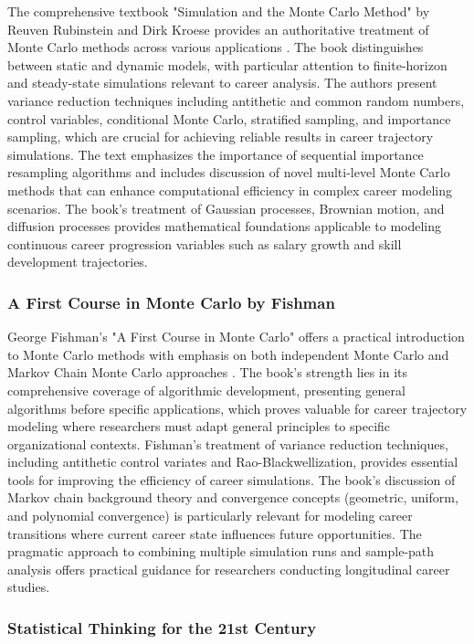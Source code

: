 \documentclass[main.tex]{subfiles}
\begin{document}
The comprehensive textbook "Simulation and the Monte Carlo Method" by Reuven Rubinstein and Dirk Kroese provides an authoritative treatment of Monte Carlo methods across various applications \parencite{rubinstein2016,rubinstein2017}. The book distinguishes between static and dynamic models, with particular attention to finite-horizon and steady-state simulations relevant to career analysis. The authors present variance reduction techniques including antithetic and common random numbers, control variables, conditional Monte Carlo, stratified sampling, and importance sampling, which are crucial for achieving reliable results in career trajectory simulations. The text emphasizes the importance of sequential importance resampling algorithms and includes discussion of novel multi-level Monte Carlo methods that can enhance computational efficiency in complex career modeling scenarios. The book's treatment of Gaussian processes, Brownian motion, and diffusion processes provides mathematical foundations applicable to modeling continuous career progression variables such as salary growth and skill development trajectories.

\subsubsection{A First Course in Monte Carlo by Fishman}

George Fishman's "A First Course in Monte Carlo" offers a practical introduction to Monte Carlo methods with emphasis on both independent Monte Carlo and Markov Chain Monte Carlo approaches \parencite{fishman2006}. The book's strength lies in its comprehensive coverage of algorithmic development, presenting general algorithms before specific applications, which proves valuable for career trajectory modeling where researchers must adapt general principles to specific organizational contexts. Fishman's treatment of variance reduction techniques, including antithetic control variates and Rao-Blackwellization, provides essential tools for improving the efficiency of career simulations. The book's discussion of Markov chain background theory and convergence concepts (geometric, uniform, and polynomial convergence) is particularly relevant for modeling career transitions where current career state influences future opportunities. The pragmatic approach to combining multiple simulation runs and sample-path analysis offers practical guidance for researchers conducting longitudinal career studies.

\subsubsection{Statistical Thinking for the 21st Century}
\end{document}
